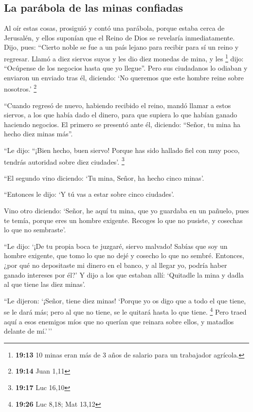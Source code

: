 \hypertarget{la-paruxe1bola-de-las-minas-confiadas}{%
\subsection{La parábola de las minas
confiadas}\label{la-paruxe1bola-de-las-minas-confiadas}}

 Al oír estas cosas, prosiguió y contó una parábola,
porque estaba cerca de Jerusalén, y ellos suponían que el Reino de Dios
se revelaría inmediatamente.  Dijo, pues: ``Cierto noble
se fue a un país lejano para recibir para sí un reino y regresar.
 Llamó a diez siervos suyos y les dio diez monedas de
mina, y les \footnote{\textbf{19:13} 10 minas eran más de 3 años de
  salario para un trabajador agrícola.} dijo: ``Ocúpense de los negocios
hasta que yo llegue''.  Pero sus ciudadanos lo odiaban y
enviaron un enviado tras él, diciendo: `No queremos que este hombre
reine sobre nosotros.' \footnote{\textbf{19:14} Juan 1,11}

 ``Cuando regresó de nuevo, habiendo recibido el reino,
mandó llamar a estos siervos, a los que había dado el dinero, para que
supiera lo que habían ganado haciendo negocios.  El
primero se presentó ante él, diciendo: ``Señor, tu mina ha hecho diez
minas más''.

 ``Le dijo: ``¡Bien hecho, buen siervo! Porque has sido
hallado fiel con muy poco, tendrás autoridad sobre diez ciudades'.
\footnote{\textbf{19:17} Luc 16,10}

 ``El segundo vino diciendo: `Tu mina, Señor, ha hecho
cinco minas'.

 ``Entonces le dijo: `Y tú vas a estar sobre cinco
ciudades'.

 Vino otro diciendo: `Señor, he aquí tu mina, que yo
guardaba en un pañuelo,  pues te temía, porque eres un
hombre exigente. Recoges lo que no pusiste, y cosechas lo que no
sembraste'.

 ``Le dijo: `¡De tu propia boca te juzgaré, siervo
malvado! Sabías que soy un hombre exigente, que tomo lo que no dejé y
cosecho lo que no sembré.  Entonces, ¿por qué no
depositaste mi dinero en el banco, y al llegar yo, podría haber ganado
intereses por él?'  Y dijo a los que estaban allí:
`Quitadle la mina y dadla al que tiene las diez minas'.

 ``Le dijeron: `¡Señor, tiene diez minas! 
`Porque yo os digo que a todo el que tiene, se le dará más; pero al que
no tiene, se le quitará hasta lo que tiene. \footnote{\textbf{19:26} Luc
  8,18; Mat 13,12}  Pero traed aquí a esos enemigos míos
que no querían que reinara sobre ellos, y matadlos delante de mí.'\,''

